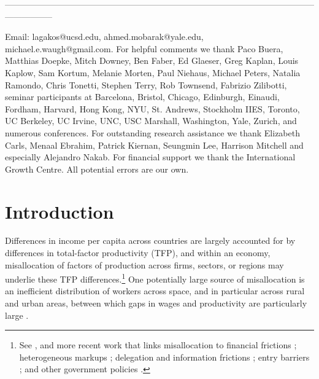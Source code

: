 \documentclass[12pt,pdftex]{article}
\begin{document}
-----------------------------------------------------------------------------------------------------------------------------

\vspace{0.2cm}

\footnotesize \singlespacing Email: lagakos@ucsd.edu, ahmed.mobarak@yale.edu, michael.e.waugh@gmail.com. For helpful comments we thank Paco Buera, Matthias Doepke, Mitch Downey, Ben Faber, Ed Glaeser, Greg Kaplan, Louis Kaplow, Sam Kortum, Melanie Morten, Paul Niehaus, Michael Peters, Natalia Ramondo, Chris Tonetti, Stephen Terry, Rob Townsend, Fabrizio Zilibotti, seminar participants at Barcelona, Bristol, Chicago, Edinburgh, Einaudi, Fordham, Harvard, Hong Kong, NYU, St. Andrews, Stockholm IIES, Toronto, UC Berkeley, UC Irvine, UNC, USC Marshall, Washington, Yale, Zurich, and numerous conferences.  For outstanding research assistance we thank Elizabeth Carls, Menaal Ebrahim, Patrick Kiernan, Seungmin Lee, Harrison Mitchell and especially Alejandro Nakab. For financial support we thank the International Growth Centre. All potential errors are our own.

\hspace{-0.1cm}


\thispagestyle{empty}

\setcounter{page}{0}
\normalsize

\onehalfspacing

\section{Introduction}

Differences in income per capita across countries are largely accounted for by differences in total-factor productivity (TFP), and within an economy, misallocation of factors of production across firms, sectors, or regions may underlie these TFP differences.\footnote{See \citet{rero08}, \citet{hskl09} and more recent work that links misallocation to  financial frictions \citep{bush13,mixu14,moll14}; heterogeneous markups \citep{pete16}; delegation and information frictions \citep{daho16,akal16}; entry barriers \citep{yang16}; and other government policies \citep{guve08,famo19}.} One potentially large source of misallocation is an inefficient distribution of workers across space, and in particular across rural and urban areas, between which gaps in wages and productivity are particularly large \citep{young2013inequality,gola14,hesc18}.
\end{document}
